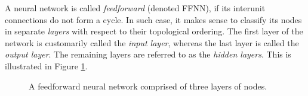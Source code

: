 A neural network is called \textit{feedforward} (denoted FFNN), if its interunit connections do not form a cycle. In such case, it makes sense to classify its nodes in separate \textit{layers} with respect to their topological ordering. The first layer of the network is customarily called the \textit{input layer}, whereas the last layer is called the \textit{output layer}. The remaining layers are referred to as the \textit{hidden layers}. This is illustrated in Figure \ref{fig:FFNN}.

\begin{figure}[ht]
	\centering
	\scriptsize
	\caption[A feedforward neural network.]{A feedforward neural network comprised of three layers of nodes.}
	\label{fig:FFNN}
\end{figure}

